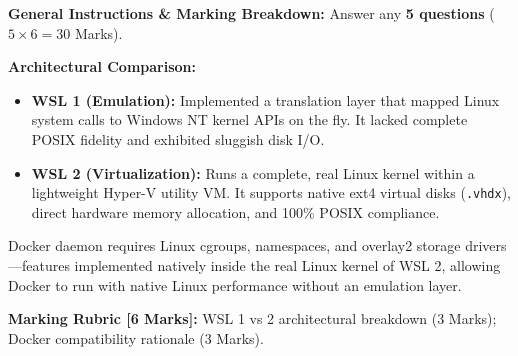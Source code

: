
\begin{markingrubric}
\textbf{General Instructions \& Marking Breakdown:} Answer any \textbf{5 questions} ($5 \times 6 = 30$ Marks).
\end{markingrubric}


\begin{examsol}
\textbf{Architectural Comparison:}
\begin{itemize}[leftmargin=1.5em]
    \item \textbf{WSL 1 (Emulation):} Implemented a translation layer that mapped Linux system calls to Windows NT kernel APIs on the fly. It lacked complete POSIX fidelity and exhibited sluggish disk I/O.
    \item \textbf{WSL 2 (Virtualization):} Runs a complete, real Linux kernel within a lightweight Hyper-V utility VM. It supports native ext4 virtual disks (\texttt{.vhdx}), direct hardware memory allocation, and 100\% POSIX compliance.
\end{itemize}
Docker daemon requires Linux cgroups, namespaces, and overlay2 storage drivers—features implemented natively inside the real Linux kernel of WSL 2, allowing Docker to run with native Linux performance without an emulation layer.

\begin{markingrubric}
\textbf{Marking Rubric [6 Marks]:} WSL 1 vs 2 architectural breakdown (3 Marks); Docker compatibility rationale (3 Marks).
\end{markingrubric}
\end{examsol}


